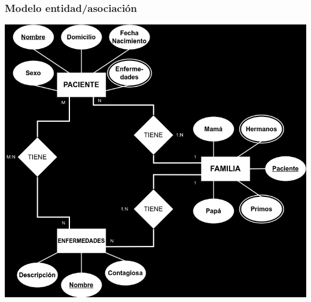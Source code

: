 \documentclass[a4paper,12pt]{article}
\begin{document}
\subsubsection*{Modelo entidad/asociación}
\begin{center}
    \includegraphics[scale = .5]{IMA/Ejercio2.png}
\end{center}
\end{document}

